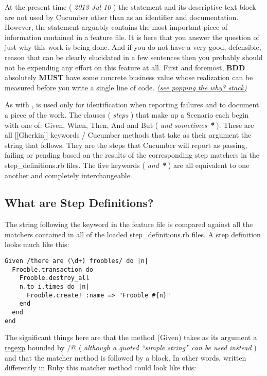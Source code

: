 At the present time ( \emph{2013-Jul-10} ) the \verb@Feature@ statement and its descriptive text block are not used by Cucumber other than as an identifier and documentation.  However, the \verb@Feature@ statement arguably contains the most important piece of information contained in a feature file.  It is here that you answer the question of just why this work is being done.  And if you do not have a very good, defensible, reason that can be clearly elucidated in a few sentences then you probably should not be expending any effort on this feature at all.  First and foremost, \textbf{BDD} absolutely \textbf{MUST} have some concrete business value whose realization can be measured before you write a single line of code. \emph{\href{http://www.mattblodgett.com/2009/01/pop-stack.html}{(see popping the why? stack)}}

As with \verb@Feature@, \verb@Scenario@ is used only for identification when reporting failures and to document a piece of the work.  The clauses ( \emph{steps} ) that make up a Scenario each begin with one of: Given, When, Then, And and But ( \emph{ and sometimes \textbf{*}} ).  These are all [[Gherkin]] keywords / Cucumber methods that take as their argument the string that follows.  They are the steps that Cucumber will report as passing, failing or pending based on the results of the corresponding step matchers in the step\_definitions.rb files.  The five keywords ( \emph{ and \textbf{*}} ) are all equivalent to one another and completely interchangeable.

\subsection{What are Step Definitions?}

The string following the keyword in the feature file is compared against all the matchers contained in all of the loaded step\_definitions.rb files.  A step definition looks much like this:
\begin{verbatim}
Given /there are (\d+) froobles/ do |n|
  Frooble.transaction do
    Frooble.destroy_all
    n.to_i.times do |n|
      Frooble.create! :name => "Frooble #{n}"
    end
  end
end

\end{verbatim}

The significant things here are that the method (Given) takes as its argument a \href{http://en.wikipedia.org/wiki/Regexp}{regexp} bounded by  \verb@/@ ( \emph{although a quoted ``simple string'' can be used instead} ) and that the matcher method is followed by a block.  In other words, written differently in Ruby this matcher method could look like this:

